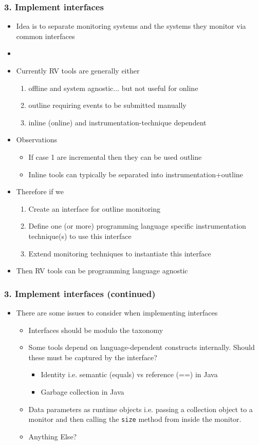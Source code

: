 \documentclass{beamer}
\newcommand{\addhere}{{\color{red} Anything Else?}}
\begin{document}
\begin{frame}
\frametitle{3. Implement interfaces}
\begin{itemize}
	\item Idea is to separate monitoring systems and the systems they monitor via common interfaces
	\item[]
	\item Currently RV tools are generally either
	\begin{enumerate}
		\item offline and system agnostic... but not useful for online
		\item outline requiring events to be submitted manually
		\item inline (online) and instrumentation-technique dependent
	\end{enumerate}
	\item Observations
	\begin{itemize}
		\item If case 1 are incremental then they can be used outline
		\item Inline tools can typically be separated into instrumentation+outline
	\end{itemize}
	\item Therefore if we
	\begin{enumerate}
		\item Create an interface for outline monitoring
		\item Define one (or more) programming language specific instrumentation technique(s) to use this interface
		\item Extend monitoring techniques to instantiate this interface
	\end{enumerate}
	\item Then RV tools can be programming language agnostic
\end{itemize}
\end{frame}	
	

\begin{frame}
\frametitle{3. Implement interfaces (continued)}	
\begin{itemize}
	\item There are some issues to consider when implementing interfaces
	\begin{itemize}
		\item Interfaces should be modulo the taxonomy
		\item Some tools depend on language-dependent constructs internally. Should these must be captured by the interface?
		\begin{itemize}
			\item Identity i.e. semantic (equals) vs reference (==) in Java
			\item Garbage collection in Java
		\end{itemize}
		\item Data parameters as runtime objects i.e. passing a collection object to a monitor and then calling the \texttt{size} method from inside the monitor.
		\item \addhere{}
	\end{itemize}
\end{itemize}
\end{frame}
\end{document}

